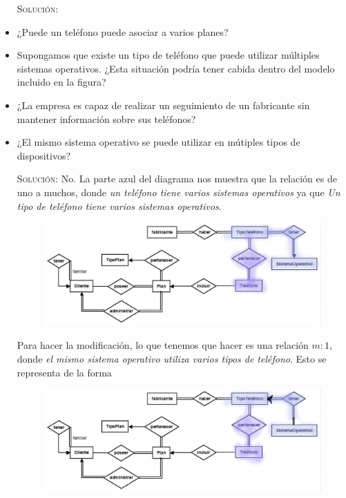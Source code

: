 \documentclass[letterpaper,11pt]{article}
\begin{document}
\begin{itemize}
    \textsc{Solución:}

    \item ¿Puede un teléfono puede asociar a varios planes?
    
    \item Supongamos que existe un tipo de teléfono que puede utilizar múltiples
    sistemas operativos. ¿Esta situación podría tener cabida dentro del modelo 
    incluido en la figura?

    \item ¿La empresa es capaz de realizar un seguimiento de un fabricante sin 
    mantener información sobre sus teléfonos?

    \item ¿El mismo sistema operativo se puede utilizar en mútiples tipos de  
    dispositivos? 

    \textsc{Solución:} No. La parte azul del diagrama nos muestra que la 
    relación es de uno a muchos, donde \textit{un teléfono tiene varios 
    sistemas operativos} ya que \textit{Un tipo de teléfono tiene varios 
    sistemas operativos}. 

    \begin{figure}[h]
        \centering
        \includegraphics[scale=0.4]{./imagenes/modelo9.jpg}
    \end{figure}

    Para hacer la modificación, lo que tenemos que hacer es una relación $m:1$, 
    donde \textit{el mismo sistema operativo utiliza varios tipos de teléfono}.
    Esto se representa de la forma

    \begin{figure}[h]
        \centering
        \includegraphics[scale=0.4]{./imagenes/modelo9i.jpg}
    \end{figure}


\end{itemize}
\end{document}
